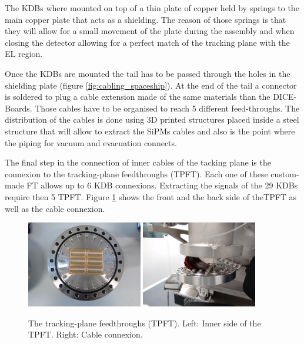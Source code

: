 The KDBs  where mounted on top of a thin plate of copper held by springs to the main copper plate that acts as a shielding. The reason of those springs is that they will allow for a small movement of the plate during the assembly and when closing the detector allowing for a perfect match of the tracking plane with the EL region. 

Once the KDBs are mounted the tail has to be passed through the holes in the shielding plate 
(figure \ref{fig:cabling_spaceship}). At the end of the tail a connector is soldered to plug a cable extension made of the same materials than the DICE-Boards. Those cables have to be organised to reach 5 different feed-throughs. The distribution of the cables is done using 3D printed structures placed inside a steel structure that will allow to extract the SiPMs cables and also is the point where the piping for vacuum and evacuation connects.


The final step in the connection of inner cables of the tacking plane is the connexion to the tracking-plane feedthroughs (TPFT). Each one of these custom-made FT allows up to 6 KDB connexions. Extracting the signals of the 29 KDBs require then  5 TPFT. Figure \ref{fig:TPFT} shows the front and the back side of theTPFT as well as the cable connexion.

\begin{figure}[hpt!]
\centering
\includegraphics[width=0.45\textwidth]{img2/TPFT1.png}
\includegraphics[width=0.45\textwidth]{img2/TPFT_connected.png}
\caption{The tracking-plane feedthroughs (TPFT). Left: Inner side of the TPFT. Right: Cable connexion.}
\label{fig:TPFT}
\end{figure}


